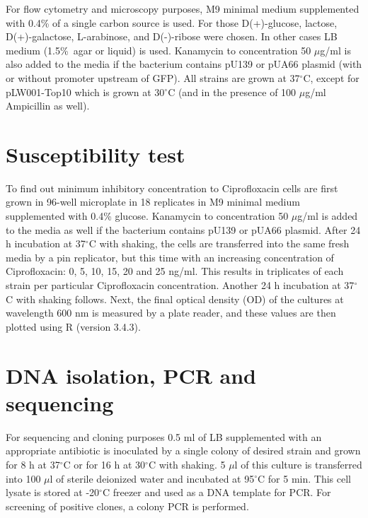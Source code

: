 For flow cytometry and microscopy purposes, M9 minimal medium supplemented with 0.4\% of a single carbon source is used.
For those D(+)-glucose, lactose, D(+)-galactose, L-arabinose, and D(-)-ribose were chosen.
In other cases LB medium (1.5\%~agar or liquid) is used.
Kanamycin to concentration 50 $\mu$g/ml is also added to the media if the bacterium contains pU139 or pUA66 plasmid (with or without promoter upstream of GFP).
All strains are grown at 37$^{\circ}$C, except for pLW001-Top10 which is grown at 30$^{\circ}$C (and in the presence of 100 $\mu$g/ml Ampicillin as well).


\hypertarget{MIC}{\section{Susceptibility test}}
To find out minimum inhibitory concentration to Ciprofloxacin cells are first grown in 96-well microplate in 18 replicates in M9 minimal medium supplemented with 0.4\% glucose.
Kanamycin to concentration 50 $\mu$g/ml is added to the media as well if the bacterium contains pU139 or pUA66 plasmid.
After 24 h incubation at 37$^{\circ}$C with shaking, the cells are transferred into the same fresh media by a pin replicator, but this time with an increasing concentration of Ciprofloxacin: 0, 5, 10, 15, 20 and 25 ng/ml.
This results in triplicates of each strain per particular Ciprofloxacin concentration.
Another 24 h incubation at 37$^{\circ}$C with shaking follows.
Next, the final optical density (OD) of the cultures at wavelength 600 nm is measured by a plate reader, and these values are then plotted using R (version 3.4.3).


\section{DNA isolation, PCR and sequencing}
For sequencing and cloning purposes 0.5 ml of LB supplemented with an appropriate antibiotic is inoculated by a single colony of desired strain and grown for 8 h at 37$^{\circ}$C or for 16 h at 30$^{\circ}$C with shaking.
5 $\mu$l of this culture is transferred into 100 $\mu$l of sterile deionized water and incubated at 95$^{\circ}$C for 5 min.
This cell lysate is stored at -20$^{\circ}$C freezer and used as a DNA template for PCR.
For screening of positive clones, a colony PCR is performed.

